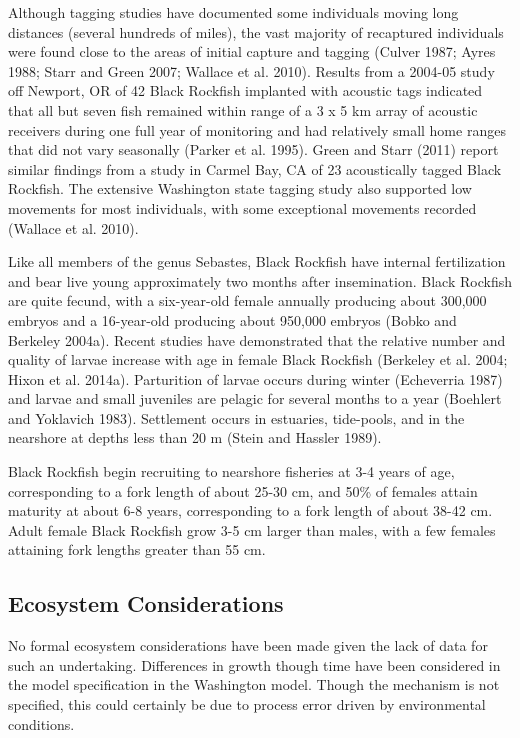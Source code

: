 \documentclass[11pt,
  english,
  letterpaper,
]{article}
\begin{document}
Although tagging studies have documented some individuals moving long distances (several hundreds of miles), the vast majority of recaptured individuals were found close to the areas of initial capture and tagging (Culver 1987; Ayres 1988; Starr and Green 2007; Wallace et al. 2010). Results from a 2004-05 study off Newport, OR of 42 Black Rockfish implanted with acoustic tags indicated that all but seven fish remained within range of a 3 x 5 km array of acoustic receivers during one full year of monitoring and had relatively small home ranges that did not vary seasonally (Parker et al. 1995). Green and Starr (2011) report similar findings from a study in Carmel Bay, CA of 23 acoustically tagged Black Rockfish. The extensive Washington state tagging study also supported low movements for most individuals, with some exceptional movements recorded (Wallace et al. 2010).

Like all members of the genus Sebastes, Black Rockfish have internal fertilization and bear live young approximately two months after insemination. Black Rockfish are quite fecund, with a six-year-old female annually producing about 300,000 embryos and a 16-year-old producing about 950,000 embryos (Bobko and Berkeley 2004a). Recent studies have demonstrated that the relative number and quality of larvae increase with age in female Black Rockfish (Berkeley et al. 2004; Hixon et al. 2014a). Parturition of larvae occurs during winter (Echeverria 1987) and larvae and small juveniles are pelagic for several months to a year (Boehlert and Yoklavich 1983). Settlement occurs in estuaries, tide-pools, and in the nearshore at depths less than 20 m (Stein and Hassler 1989).

Black Rockfish begin recruiting to nearshore fisheries at 3-4 years of age, corresponding to a fork length of about 25-30 cm, and 50\% of females attain maturity at about 6-8 years, corresponding to a fork length of about 38-42 cm. Adult female Black Rockfish grow 3-5 cm larger than males, with a few females attaining fork lengths greater than 55 cm.

\hypertarget{ecosystem-considerations-1}{%
\subsection{Ecosystem Considerations}\label{ecosystem-considerations-1}}

No formal ecosystem considerations have been made given the lack of data for such an undertaking. Differences in growth though time have been considered in the model specification in the Washington model. Though the mechanism is not specified, this could certainly be due to process error driven by environmental conditions.
\end{document}
